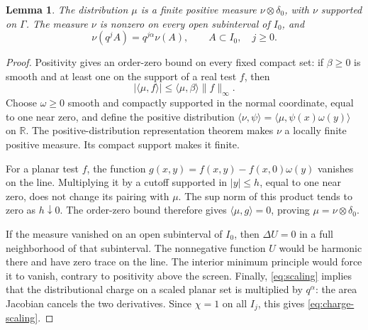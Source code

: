 \documentclass[11pt]{article}
\newtheorem{lemma}[theorem]{Lemma}
\newcommand{\R}{\mathbb R}
\begin{document}
\begin{lemma}\label{lem:measure}
The distribution \(\mu\) is a finite positive measure
\(\nu\otimes\delta_0\), with \(\nu\) supported on \(\Gamma\).
The measure \(\nu\) is nonzero on every open subinterval of \(I_0\), and
\begin{equation}\label{eq:charge-scaling}
 \nu(q^j A)=q^{j\alpha}\nu(A),\qquad A\subset I_0,\quad j\ge0 .
\end{equation}
\end{lemma}
\begin{proof}
Positivity gives an order-zero bound on every fixed compact set:
if \(\beta\ge0\) is smooth and at least one on the support of a real
test \(f\), then
\[
 |\langle\mu,f\rangle|\le\langle\mu,\beta\rangle\|f\|_\infty .
\]
Choose \(\omega\ge0\) smooth and compactly supported in the normal
coordinate, equal to one near zero, and define the positive distribution
\(\langle\nu,\psi\rangle=\langle\mu,\psi(x)\omega(y)\rangle\) on \(\R\).
The positive-distribution representation theorem
\cite[Proposition 1.9.11 and Remark 1.9.12]{Nonn} makes \(\nu\) a locally
finite positive measure. Its compact support makes it finite.

For a planar test \(f\), the function
\(g(x,y)=f(x,y)-f(x,0)\omega(y)\) vanishes on the line.
Multiplying it by a cutoff supported in \(|y|\le h\), equal to one near
zero, does not change its pairing with \(\mu\).
The sup norm of this product tends to zero as \(h\downarrow0\).
The order-zero bound therefore gives \(\langle\mu,g\rangle=0\),
proving \(\mu=\nu\otimes\delta_0\).

If the measure vanished on an open subinterval of \(I_0\), then
\(\Delta U=0\) in a full neighborhood of that subinterval.
The nonnegative function \(U\) would be harmonic there and have zero
trace on the line. The interior minimum principle would force it to
vanish, contrary to positivity above the screen. Finally,
\eqref{eq:scaling} implies that the distributional charge on a scaled
planar set is multiplied by \(q^\alpha\): the area Jacobian cancels the
two derivatives. Since \(\chi=1\) on all \(I_j\), this gives
\eqref{eq:charge-scaling}.
\end{proof}
\end{document}
